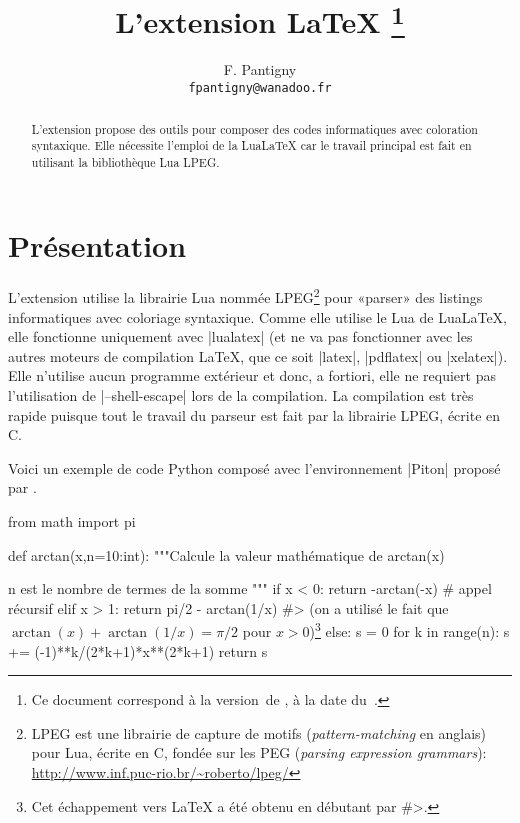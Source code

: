 \documentclass[dvipsnames,svgnames]{article}
\begin{document}


\title{L'extension LaTeX \thanks{Ce document correspond à la 
version~\PitonFileVersion\space de , à la date du~\PitonFileDate.}} 
\author{F. Pantigny \\ \texttt{fpantigny@wanadoo.fr}}

\maketitle

\begin{abstract}
L'extension  propose des outils pour composer des codes informatiques avec
coloration syntaxique. Elle nécessite l'emploi de la LuaLaTeX car le travail principal est
fait en utilisant la bibliothèque Lua LPEG.
\end{abstract}


\section{Présentation}

L'extension  utilise la librairie Lua nommée LPEG\footnote{LPEG est
  une librairie de capture de motifs (\emph{pattern-matching} en anglais) pour
  Lua, écrite en C, fondée sur les PEG (\emph{parsing expression grammars}):
  \url{http://www.inf.puc-rio.br/~roberto/lpeg/}} pour «parser» des listings
informatiques avec coloriage syntaxique. Comme elle utilise le Lua de LuaLaTeX,
elle fonctionne uniquement avec |lualatex| (et ne va pas fonctionner avec les
autres moteurs de compilation LaTeX, que ce soit |latex|, |pdflatex| ou
|xelatex|). Elle n'utilise aucun programme extérieur et donc, a fortiori, elle
ne requiert pas l'utilisation de |--shell-escape| lors de la compilation. La
compilation est très rapide puisque tout le travail du parseur est fait par la
librairie LPEG, écrite en C.

\medskip
Voici un exemple de code Python composé avec l'environnement |{Piton}|
proposé par .


\medskip
\begin{Piton}
from math import pi

def arctan(x,n=10:int):
    """Calcule la valeur mathématique de arctan(x)

    n est le nombre de termes de la somme
    """
    if x < 0:
        return -arctan(-x) # appel récursif
    elif x > 1: 
        return pi/2 - arctan(1/x) 
        #> (on a utilisé le fait que $\arctan(x)+\arctan(1/x)=\pi/2$ pour $x>0$)\footnote{Cet échappement vers LaTeX a été obtenu en débutant par \ttfamily\#>.} 
    else: 
        s = 0
        for k in range(n):
            s += (-1)**k/(2*k+1)*x**(2*k+1)
        return s
\end{Piton}
\end{document}
